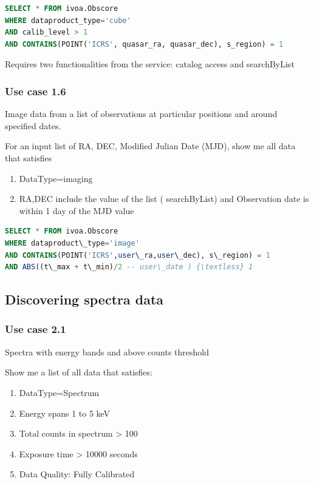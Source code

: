 \documentclass[11pt,a4paper]{ivoa}
\begin{document}
\begin{lstlisting}[language=SQL,flexiblecolumns=true]
SELECT * FROM ivoa.Obscore
WHERE dataproduct_type='cube'
AND calib_level > 1
AND CONTAINS(POINT('ICRS', quasar_ra, quasar_dec), s_region) = 1
\end{lstlisting}

Requires two functionalities from the service: catalog access and searchByList

\subsubsection[Use case 1.6 ]{Use case 1.6}
Image data from a list of observations at particular positions and around specified dates.

For an input list of RA, DEC, Modified Julian Date (MJD), show me all data that satisfies

\begin{enumerate}
\item DataType=imaging
\item RA,DEC include the value of  the list ( searchByList) and Observation date is within 1 day of the MJD value
\end{enumerate}

\begin{lstlisting}[language=SQL,flexiblecolumns=true]
SELECT * FROM ivoa.Obscore
WHERE dataproduct\_type='image'
AND CONTAINS(POINT('ICRS',user\_ra,user\_dec), s\_region) = 1
AND ABS((t\_max + t\_min)/2 -- user\_date ) {\textless} 1
\end{lstlisting}


\subsection{Discovering spectra data}

\subsubsection{Use case 2.1}
Spectra with energy bands and above counts threshold

Show me a list of all data that satisfies:

\begin{enumerate}
\item DataType=Spectrum
\item Energy spans 1 to 5 keV
\item Total counts in spectrum {\textgreater} 100
\item Exposure time {\textgreater} 10000 seconds
\item Data Quality: Fully Calibrated
\end{enumerate}
\end{document}
